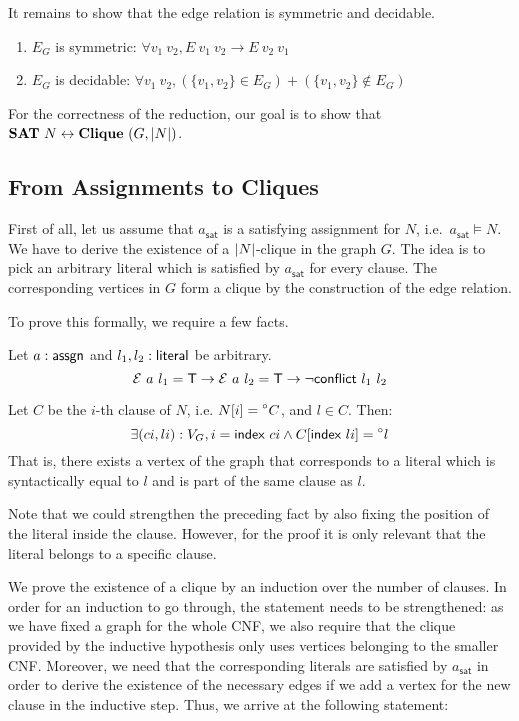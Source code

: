 It remains to show that the edge relation is symmetric and decidable.
\begin{proposition}[Properties of $E_G$]
  \begin{enumerate}
    \item $E_G$ is symmetric: $\forall v_1~v_2, E~v_1~v_2 \rightarrow E~v_2~v_1$
    \item $E_G$ is decidable: $\forall v_1~v_2, (\{v_1, v_2\} \in E_G) + (\{v_1, v_2 \} \notin E_G)$
  \end{enumerate}
\end{proposition}

For the correctness of the reduction, our goal is to show that $\textbf{SAT}{}~N \leftrightarrow \textbf{Clique}{}~(G, |N|)$. 

\subsection{From Assignments to Cliques}
First of all, let us assume that $a_\textsf{sat}$ is a satisfying assignment for $N$, i.e.\ $a_\textsf{sat} \models N$. 
We have to derive the existence of a $|N|$-clique in the graph $G$. The idea is to pick an arbitrary literal which is satisfied by $a_\textsf{sat}$ for every clause. The corresponding vertices in $G$ form a clique by the construction of the edge relation. 

To prove this formally, we require a few facts. 
\begin{fact}\label{fact:literal_conflict}
  Let $a : \textsf{assgn}$ and $l_1, l_2 : \textsf{literal}$ be arbitrary. 
  \[\mathcal{E}~a~l_1 = \mathsf{T} \rightarrow \mathcal{E}~a~l_2 = \mathsf{T} \rightarrow \lnot \textsf{conflict}{}~l_1~l_2 \]
\end{fact}

\begin{fact}\label{fact:litInClause_exists_vertex}
  Let $C$ be the $i$-th clause of $N$, i.e. $N[i] = \prescript{\circ}{}C$, and $l \in C$. Then:
  \[\exists (ci,li) : V_G, i = \textsf{index}~ci \land C[\textsf{index}~li] = \prescript{\circ}{}l\]
  That is, there exists a vertex of the graph that corresponds to a literal which is syntactically equal to $l$ and is part of the same clause as $l$.
\end{fact}
Note that we could strengthen the preceding fact by also fixing the position of the literal inside the clause. However, for the proof it is only relevant that the literal belongs to a specific clause.

We prove the existence of a clique by an induction over the number of clauses. In order for an induction to go through, the statement needs to be strengthened: as we have fixed a graph for the whole CNF, we also require that the clique provided by the inductive hypothesis only uses vertices belonging to the smaller CNF. Moreover, we need that the corresponding literals are satisfied by $a_{\textsf{sat}}$ in order to derive the existence of the necessary edges if we add a vertex for the new clause in the inductive step. Thus, we arrive at the following statement:

